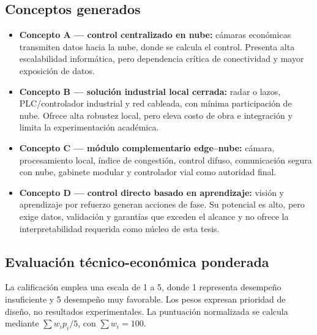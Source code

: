 \documentclass[12pt,a4paper,oneside]{report}
\begin{document}
\subsection{Conceptos generados}\label{conceptos-generados-v2}

\begin{itemize}
\item \textbf{Concepto A --- control centralizado en nube:} cámaras económicas transmiten datos hacia la nube, donde se calcula el control. Presenta alta escalabilidad informática, pero dependencia crítica de conectividad y mayor exposición de datos.
\item \textbf{Concepto B --- solución industrial local cerrada:} radar o lazos, PLC/controlador industrial y red cableada, con mínima participación de nube. Ofrece alta robustez local, pero eleva costo de obra e integración y limita la experimentación académica.
\item \textbf{Concepto C --- módulo complementario edge--nube:} cámara, procesamiento local, índice de congestión, control difuso, comunicación segura con nube, gabinete modular y controlador vial como autoridad final.
\item \textbf{Concepto D --- control directo basado en aprendizaje:} visión y aprendizaje por refuerzo generan acciones de fase. Su potencial es alto, pero exige datos, validación y garantías que exceden el alcance y no ofrece la interpretabilidad requerida como núcleo de esta tesis.
\end{itemize}

\subsection{Evaluación técnico-económica ponderada}\label{evaluacion-ponderada-v2}

La calificación emplea una escala de 1 a 5, donde 1 representa desempeño insuficiente y 5 desempeño muy favorable. Los pesos expresan prioridad de diseño, no resultados experimentales. La puntuación normalizada se calcula mediante \(\sum w_i p_i/5\), con \(\sum w_i=100\).
\end{document}
